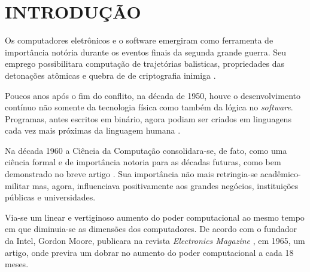 


\section{\textbf{INTRODUÇÃO}}
    \label{sec:introdução}



    Os computadores eletrônicos e o software emergiram como ferramenta de importância
    notória durante os eventos finais da segunda grande guerra. Seu emprego possibilitara
    computação de trajetórias balisticas, propriedades das detonações atômicas e quebra de
    de criptografia inimiga \cite[~p.4]{dodig2001history}.
    
    Poucos anos após o fim do conflito, na década de 1950, houve o desenvolvimento contínuo
    não somente da tecnologia física como também da lógica no \textit{software}.
    Programas, antes escritos em binário, agora podiam ser criados em linguagens
    cada vez mais próximas da linguagem humana \cite[~p.5]{dodig2001history}.

    Na década 1960 a Ciência da Computação consolidara-se, de fato, como uma ciência formal
    e de importância notoria para as décadas futuras, como bem demonstrado no breve artigo 
    \cite{newell1967what}. Sua importância não mais retringia-se acadêmico-militar mas,
    agora, influenciava positivamente aos grandes negócios, instituições públicas e universidades.

    Via-se um linear e vertiginoso aumento do poder computacional ao mesmo tempo em
    que diminuia-se as dimensões dos computadores. De acordo com 
    o fundador da Intel, Gordon Moore, publicara na revista \textit{ Electronics Magazine }
    , em 1965, um artigo, onde previra um dobrar no aumento do poder computacional a cada 18 meses.

